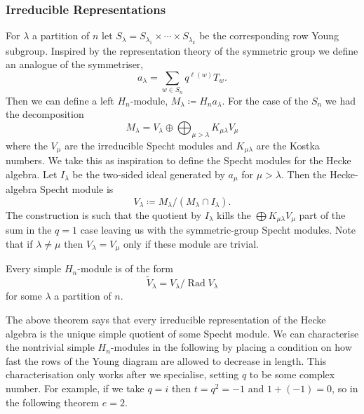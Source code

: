 \documentclass[fleqn]{NotesClass}
\DeclareMathOperator{\Rad}{Rad}
\begin{document}
    \subsubsection{Irreducible Representations}
    For \(\lambda\) a partition of \(n\) let \(S_\lambda = S_{\lambda_1} \times \dotsb \times S_{\lambda_k}\) be the corresponding row Young subgroup.
    Inspired by the representation theory of the symmetric group we define an analogue of the symmetriser,
    \begin{equation}
        a_\lambda = \sum_{w \in S_n} q^{\ell(w)} T_w.
    \end{equation}
    Then we can define a left \(H_n\)-module, \(M_\lambda \coloneq H_n a_\lambda\).
    For the case of the \(S_n\) we had the decomposition
    \begin{equation}
        M_\lambda = V_\lambda \oplus \bigoplus_{\mu > \lambda} K_{\mu\lambda}V_\mu
    \end{equation}
    where the \(V_\mu\) are the irreducible Specht modules and \(K_{\mu\lambda}\) are the Kostka numbers.
    We take this as inspiration to define the Specht modules for the Hecke algebra.
    Let \(I_\lambda\) be the two-sided ideal generated by \(a_\mu\) for \(\mu > \lambda\).
    Then the Hecke-algebra Specht module is
    \begin{equation}
        V_\lambda \coloneq M_\lambda / (M_\lambda \cap I_\lambda).
    \end{equation}
    The construction is such that the quotient by \(I_\lambda\) kills the \(\bigoplus K_{\mu\lambda} V_\mu\) part of the sum in the \(q = 1\) case leaving us with the symmetric-group Specht modules.
    Note that if \(\lambda \ne \mu\) then \(V_\lambda = V_\mu\) only if these module are trivial.
    
    \begin{thm}{}{}
        Every simple \(H_n\)-module is of the form
        \begin{equation}
            \tilde{V}_\lambda = V_\lambda / \Rad V_\lambda
        \end{equation}
        for some \(\lambda\) a partition of \(n\).
    \end{thm}
    
    The above theorem says that every irreducible representation of the Hecke algebra is the unique simple quotient of some Specht module.
    We can characterise the nontrivial simple \(H_n\)-modules in the following by placing a condition on how fast the rows of the Young diagram are allowed to decrease in length.
    This characterisation only works after we specialise, setting \(q\) to be some complex number.
    For example, if we take \(q = i\) then \(t = q^2 = -1\) and \(1 + (-1) = 0\), so in the following theorem \(e = 2\).
    
\end{document}
